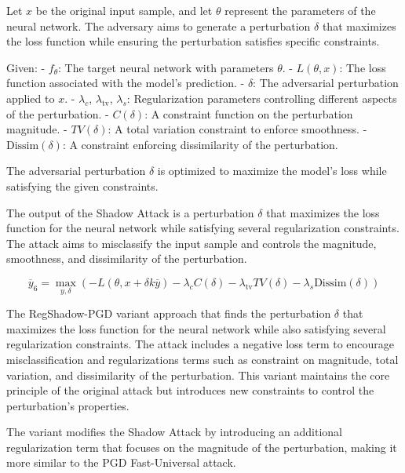 Let $x$ be the original input sample, and let $\theta$ represent the parameters of the neural network. The adversary aims to generate a perturbation $\delta$ that maximizes the loss function while ensuring the perturbation satisfies specific constraints.

Given:
- $f_{\theta}$: The target neural network with parameters $\theta$.
- $L(\theta, x)$: The loss function associated with the model’s prediction.
- $\delta$: The adversarial perturbation applied to $x$.
- $\lambda_c$, $\lambda_{\text{tv}}$, $\lambda_s$: Regularization parameters controlling different aspects of the perturbation.
- $C(\delta)$: A constraint function on the perturbation magnitude.
- $TV(\delta)$: A total variation constraint to enforce smoothness.
- $\text{Dissim}(\delta)$: A constraint enforcing dissimilarity of the perturbation.

The adversarial perturbation $\delta$ is optimized to maximize the model’s loss while satisfying the given constraints.


The output of the Shadow Attack is a perturbation $\delta$ that maximizes the loss function for the neural network while satisfying several regularization constraints. The attack aims to misclassify the input sample and controls the magnitude, smoothness, and dissimilarity of the perturbation.

\begin{equation*}
\overline{y}_6 = \max_{y, \delta} \left( -L(\theta, x + \delta k \overline{y}) - \lambda_c C(\delta) - \lambda_{\text{tv}} TV(\delta) - \lambda_s \text{Dissim}(\delta) \right)
\end{equation*}

The RegShadow-PGD variant approach that finds the perturbation $\delta$ that maximizes the loss function for the neural network while also satisfying several regularization constraints. The attack includes a negative loss term to encourage misclassification and regularizations terms such as constraint on magnitude, total variation, and dissimilarity of the perturbation. This variant maintains the core principle of the original attack but introduces new constraints to control the perturbation's properties.

The variant modifies the Shadow Attack by introducing an additional regularization term that focuses on the magnitude of the perturbation, making it more similar to the PGD Fast-Universal attack.
